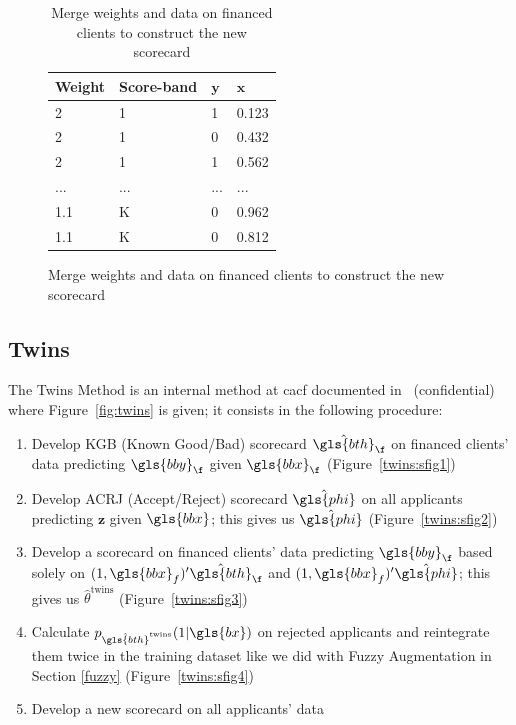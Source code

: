 \begin{table}
{\begin{multicols}{3}
\columnbreak

\begin{subfigure}[t]{0.31\textwidth}
\begin{center}
\begin{adjustbox}{max width=0.95\textwidth}

\begin{tabular}{l l l l}
\toprule
\textbf{Weight} & \textbf{Score-band} & \textbf{${\bm{y}}$} & \textbf{${\bm{x}}$}\\
\midrule
2 & 1 & 1 & 0.123 \\
2 & 1 & 0 & 0.432 \\
2 & 1 & 1 & 0.562 \\
... & ... & ... & ... \\
1.1 & K & 0 & 0.962 \\
1.1 & K & 0 & 0.812 \\
\bottomrule
\end{tabular}
\end{adjustbox}
\end{center}

\caption{Merge weights and data on financed clients to construct the new scorecard}
\label{augment:sfig3}
\end{subfigure}
\end{multicols}
}
\end{table}

\subsection{Twins} \label{Twins}

The Twins Method is an internal method at \gls{cacf} documented in~\cite{groupe} (confidential) where Figure~\ref{fig:twins} is given; it consists in the following procedure:
\begin{enumerate}
\item Develop KGB (Known Good/Bad) scorecard $\hat{\gls{bth}}_\f$ on financed clients' data predicting $\gls{bby}_\f$ given $\gls{bbx}_\f$ (Figure~\ref{twins:sfig1})
\item Develop ACRJ (Accept/Reject) scorecard $\hat{\gls{phi}}$ on all applicants predicting $\mathbf{\bm{z}}$ given $\gls{bbx}$; this gives us $\hat{\gls{phi}}$ (Figure~\ref{twins:sfig2})
\item Develop a scorecard on financed clients' data predicting $\gls{bby}_\f$ based solely on $(1,\gls{bbx}_f)' \hat{\gls{bth}}_\f$ and $(1,\gls{bbx}_f)' \hat{\gls{phi}}$; this gives us $\hat{\theta}^{\text{twins}}$ (Figure~\ref{twins:sfig3})
\item Calculate $p_{\hat{\gls{bth}}^{\text{twins}}}(1 | \gls{bx})$ on rejected applicants and reintegrate them twice in the training dataset like we did with Fuzzy Augmentation in Section \ref{fuzzy} (Figure~\ref{twins:sfig4})
\item Develop a new scorecard on all applicants' data
\end{enumerate}

